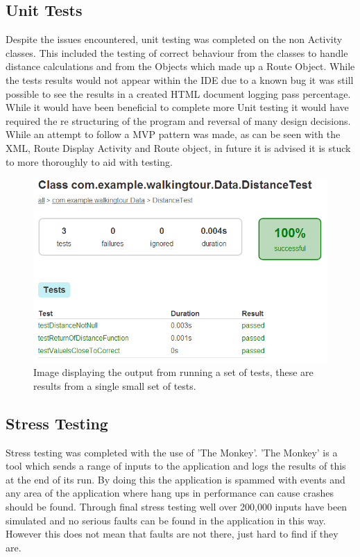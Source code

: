 \subsection{Unit Tests}
Despite the issues encountered, unit testing was completed on the non Activity classes. This included the testing of correct behaviour from the classes to handle distance calculations and from the Objects which made up a Route Object. While the tests results would not appear within the IDE due to a known bug it was still possible to see the results in a created HTML document logging pass percentage. While it would have been beneficial to complete more Unit testing it would have required the re structuring of the program and reversal of many design decisions. While an attempt to follow a MVP pattern was made, as can be seen with the XML, Route Display Activity and Route object, in future it is advised it is stuck to more thoroughly to aid with testing. 

\begin{figure}[H]
\includegraphics[scale=0.5]{Chapter4/unit.png} 
\caption[Test Output]{Image displaying the output from running a set of tests, these are results from a single small set of tests.}
\end{figure}
\subsection{Stress Testing}
Stress testing was completed with the use of 'The Monkey'. 'The Monkey' is a tool which sends a range of inputs to the application and logs the results of this at the end of its run. By doing this the application is spammed with events and any area of the application where hang ups in performance can cause crashes should be found. Through final stress testing well over 200,000 inputs have been simulated and no serious faults can be found in the application in this way. However this does not mean that faults are not there, just hard to find if they are. 


